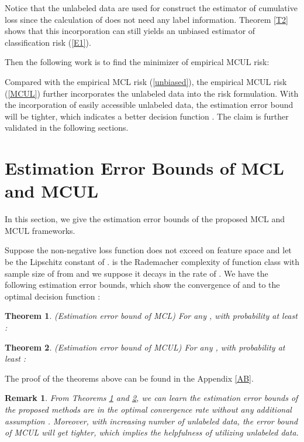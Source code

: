 \documentclass[]{article} \usepackage{geometry}
\newtheorem{theorem}{Theorem}
\newtheorem{remark}{Remark}
\begin{document}
Notice that the unlabeled data are used for construct the estimator of cumulative loss since the calculation of  does not need any label information. Theorem \ref{T2} shows that this incorporation can still yields an unbiased estimator of classification risk (\ref{E1}).

Then the following work is to find the minimizer  of empirical MCUL risk:


Compared with the empirical MCL risk (\ref{unbiased}), the empirical MCUL risk (\ref{MCUL}) further incorporates the unlabeled data into the risk formulation. With the incorporation of easily accessible unlabeled data, the estimation error bound will be tighter, which indicates a better decision function . The claim is further validated in the following sections.
\section{Estimation Error Bounds of MCL and MCUL}
In this section, we give the estimation error bounds of the proposed MCL and MCUL frameworks.

Suppose the non-negative loss function  does not exceed  on feature space  and let  be the Lipschitz constant of .  is the Rademacher complexity \cite{foundation} of function class  with sample size of  from  and we suppose it decays in the rate of . We have the following estimation error bounds, which show the convergence of  and  to the optimal decision function :
\begin{theorem}(Estimation error bound of MCL) For any , with probability at least :
\label{MCL_bound}

\end{theorem}
\begin{theorem}(Estimation error bound of MCUL) For any , with probability at least :
\label{MCUL_bound}

\end{theorem}
The proof of the theorems above can be found in the Appendix \ref{AB}.
\begin{remark}{\rm From Theorems \ref{MCL_bound} and \ref{MCUL_bound}, we can learn the estimation error bounds of the proposed methods are in the optimal convergence rate without any additional assumption \cite{vapnik}. Moreover, with increasing number of unlabeled data, the error bound of MCUL will get tighter, which implies the helpfulness of utilizing unlabeled data.}\end{remark}
\end{document}
